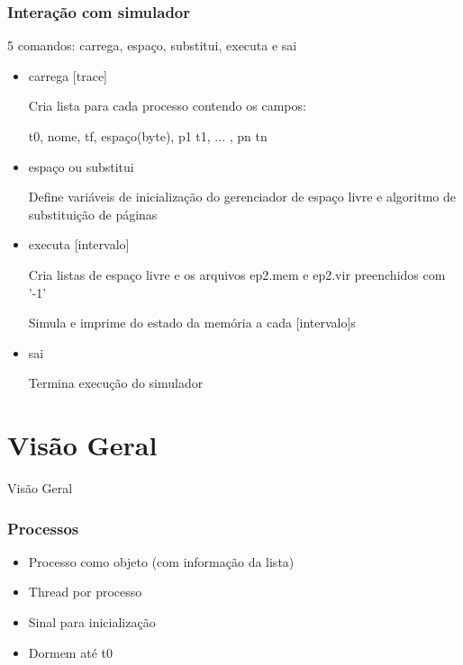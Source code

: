 \documentclass{beamer}
\begin{document}
\begin{frame}
\frametitle{Interação com simulador}
5 comandos: carrega, espaço, substitui, executa e sai
\begin{itemize}
\item carrega [trace] 

  Cria lista para cada processo contendo os campos: 
  
  t0, nome, tf, espaço(byte), p1 t1, ... , pn tn
 
\item espaço ou substitui

  Define variáveis de inicialização do gerenciador de espaço livre e algoritmo de substituição de páginas
\end{itemize}
\end{frame}


\begin{frame}

\begin{itemize}
\frametitle{Interação com simulador}
\item executa [intervalo]

  Cria listas de espaço livre e os arquivos ep2.mem e ep2.vir preenchidos com '-1'
  
  Simula e imprime do estado da memória a cada [intervalo]s
  
\item sai

  Termina execução do simulador  

\end{itemize}
\end{frame}


\section{Visão Geral} 
\begin{frame}
\begin{LARGE}
\begin{center}
Visão Geral
\end{center}
\end{LARGE}
\end{frame}


\begin{frame}
\frametitle{Processos}

\begin{itemize}
\item Processo como objeto (com informação da lista)

\item Thread por processo

\item Sinal para inicialização

\item Dormem até t0

\end{itemize}
\justifying
\end{frame}
\end{document}
